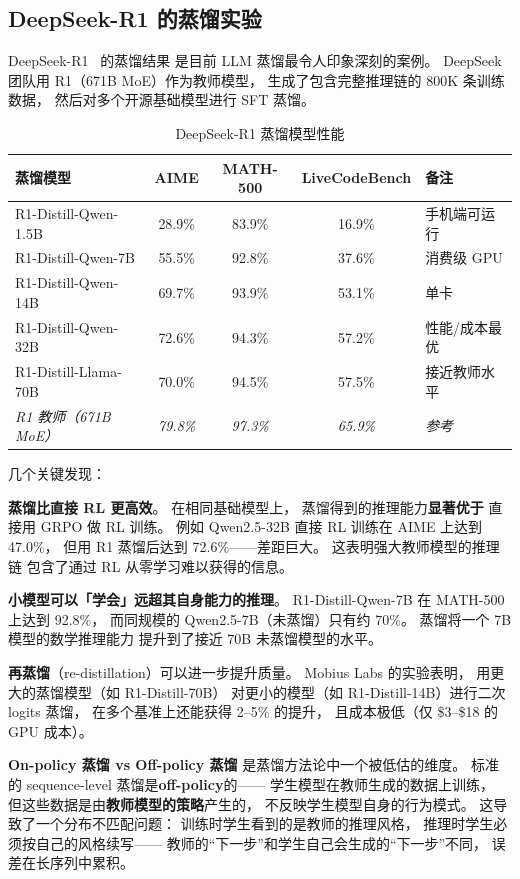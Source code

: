\subsection{DeepSeek-R1 的蒸馏实验}

DeepSeek-R1~\cite{deepseekr1} 的蒸馏结果
是目前 LLM 蒸馏最令人印象深刻的案例。
DeepSeek 团队用 R1（671B MoE）作为教师模型，
生成了包含完整推理链的 800K 条训练数据，
然后对多个开源基础模型进行 SFT 蒸馏。

\begin{table}[H]
\centering\small
\caption{DeepSeek-R1 蒸馏模型性能}
\begin{tabularx}{\linewidth}{l c c c X}
\toprule
\textbf{蒸馏模型} & \textbf{AIME} & \textbf{MATH-500} & \textbf{LiveCodeBench} & \textbf{备注} \\
\midrule
R1-Distill-Qwen-1.5B & 28.9\% & 83.9\% & 16.9\% & 手机端可运行 \\
R1-Distill-Qwen-7B & 55.5\% & 92.8\% & 37.6\% & 消费级 GPU \\
R1-Distill-Qwen-14B & 69.7\% & 93.9\% & 53.1\% & 单卡 \\
R1-Distill-Qwen-32B & 72.6\% & 94.3\% & 57.2\% & 性能/成本最优 \\
R1-Distill-Llama-70B & 70.0\% & 94.5\% & 57.5\% & 接近教师水平 \\
\midrule
\textit{R1 教师（671B MoE）} & \textit{79.8\%} & \textit{97.3\%} & \textit{65.9\%} & \textit{参考} \\
\bottomrule
\end{tabularx}
\end{table}

几个关键发现：

\textbf{蒸馏比直接 RL 更高效}。
在相同基础模型上，
蒸馏得到的推理能力\textbf{显著优于}
直接用 GRPO 做 RL 训练。
例如 Qwen2.5-32B 直接 RL 训练在 AIME 上达到 47.0\%，
但用 R1 蒸馏后达到 72.6\%——差距巨大。
这表明强大教师模型的推理链
包含了通过 RL 从零学习难以获得的信息。

\textbf{小模型可以「学会」远超其自身能力的推理}。
R1-Distill-Qwen-7B 在 MATH-500 上达到 92.8\%，
而同规模的 Qwen2.5-7B（未蒸馏）只有约 70\%。
蒸馏将一个 7B 模型的数学推理能力
提升到了接近 70B 未蒸馏模型的水平。

\textbf{再蒸馏}（re-distillation）可以进一步提升质量。
Mobius Labs 的实验表明，
用更大的蒸馏模型（如 R1-Distill-70B）
对更小的模型（如 R1-Distill-14B）进行二次 logits 蒸馏，
在多个基准上还能获得 2--5\% 的提升，
且成本极低（仅 \$3--\$18 的 GPU 成本）。

\textbf{On-policy 蒸馏 vs Off-policy 蒸馏}
是蒸馏方法论中一个被低估的维度。
标准的 sequence-level 蒸馏是\textbf{off-policy}的——
学生模型在教师生成的数据上训练，
但这些数据是由\textbf{教师模型的策略}产生的，
不反映学生模型自身的行为模式。
这导致了一个分布不匹配问题：
训练时学生看到的是教师的推理风格，
推理时学生必须按自己的风格续写——
教师的``下一步''和学生自己会生成的``下一步''不同，
误差在长序列中累积。

